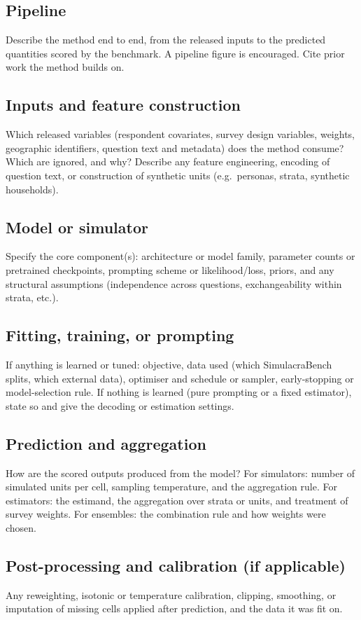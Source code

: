\documentclass{article}
\begin{document}
\subsection{Pipeline}
\label{sec:pipeline}
Describe the method end to end, from the released inputs to the predicted quantities scored by the benchmark. A pipeline figure is encouraged. Cite prior work the method builds on.

\subsection{Inputs and feature construction}
Which released variables (respondent covariates, survey design variables, weights, geographic identifiers, question text and metadata) does the method consume? Which are ignored, and why? Describe any feature engineering, encoding of question text, or construction of synthetic units (e.g.\ personas, strata, synthetic households).

\subsection{Model or simulator}
Specify the core component(s): architecture or model family, parameter counts or pretrained checkpoints, prompting scheme or likelihood/loss, priors, and any structural assumptions (independence across questions, exchangeability within strata, etc.).

\subsection{Fitting, training, or prompting}
If anything is learned or tuned: objective, data used (which SimulacraBench splits, which external data), optimiser and schedule or sampler, early-stopping or model-selection rule. If nothing is learned (pure prompting or a fixed estimator), state so and give the decoding or estimation settings.

\subsection{Prediction and aggregation}
How are the scored outputs produced from the model? For simulators: number of simulated units per cell, sampling temperature, and the aggregation rule. For estimators: the estimand, the aggregation over strata or units, and treatment of survey weights. For ensembles: the combination rule and how weights were chosen.

\subsection{Post-processing and calibration (if applicable)}
Any reweighting, isotonic or temperature calibration, clipping, smoothing, or imputation of missing cells applied after prediction, and the data it was fit on.
\end{document}
